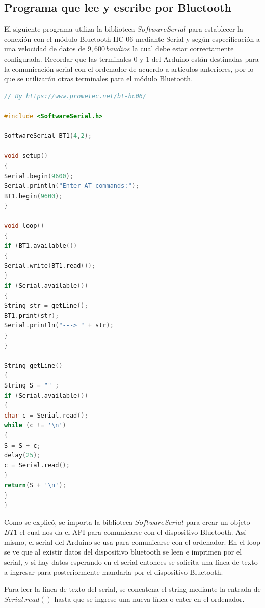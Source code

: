 \documentclass[conference]{IEEEtran}
\begin{document}
\subsection{Programa que lee y escribe por Bluetooth}

El siguiente programa utiliza la biblioteca $SoftwareSerial$ para establecer la conexión con el módulo Bluetooth HC-06 mediante Serial y según especificación a una velocidad de datos de $9,600 \, baudios$ la cual debe estar correctamente configurada. Recordar que las terminales $0$ y $1$ del Arduino están destinadas para la comunicación serial con el ordenador de acuerdo a artículos anteriores, por lo que se utilizarán otras terminales para el módulo Bluetooth.

\begin{lstlisting}[language=C, caption=Programa que lee y escribe por Bluetooth. Fuente: www.prometec.net $\mid$ MÓDULO BLUETOOTH HC-06. Under fair use. \cite{prometecnet-2019}]
// By https://www.prometec.net/bt-hc06/

#include <SoftwareSerial.h>

SoftwareSerial BT1(4,2);

void setup()
{
Serial.begin(9600);
Serial.println("Enter AT commands:");
BT1.begin(9600);
}

void loop()
{
if (BT1.available())
{
Serial.write(BT1.read());
}
if (Serial.available())
{
String str = getLine();
BT1.print(str);
Serial.println("---> " + str);
}
}

String getLine()
{
String S = "" ;
if (Serial.available())
{
char c = Serial.read();
while (c != '\n')
{
S = S + c;
delay(25);
c = Serial.read();
}
return(S + '\n');
}
}
\end{lstlisting}

\bigbreak

Como se explicó, se importa la biblioteca $SoftwareSerial$ para crear un objeto $BT1$ el cual nos da el API para comunicarse con el dispositivo Bluetooth. Así mismo, el serial del Arduino se usa para comunicarse con el ordenador. En el loop se ve que al existir datos del dispositivo bluetooth se leen e imprimen por el serial, y si hay datos esperando en el serial entonces se solicita una línea de texto a ingresar para posteriormente mandarla por el dispositivo Bluetooth.

\bigbreak

Para leer la línea de texto del serial, se concatena el string mediante la entrada de $Serial.read()$ hasta que se ingrese una nueva línea o enter en el ordenador.
\end{document}
